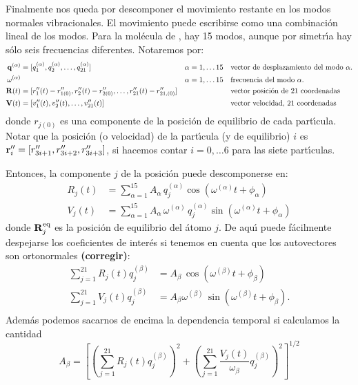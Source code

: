 Finalmente nos queda por descomponer el movimiento restante en los modos normales vibracionales. El movimiento puede escribirse como una combinaci\'{o}n lineal de los modos. Para la mol\'{e}cula de , hay 15 modos, aunque por simetr\'{\i}a hay s\'{o}lo seis frecuencias diferentes. Notaremos por:
\begin{align*}
  \mathbf{q}^{(\alpha)} &= [q^{(\alpha)}_{1},q^{(\alpha)}_{2}, \dots, q^{(\alpha)}_{21}] &  \alpha = 1,\dots 15 & \quad \text{vector de desplazamiento del modo $\alpha$.}\\
\omega^{(\alpha)} & & \alpha = 1,\dots 15  & \quad \text{frecuencia del modo $\alpha$.}\\
\mathbf{R}(t) &= [r''_{1}(t) - r''_{1(0)}, r''_{2}(t) - r''_{2 (0)}, \dots, r''_{21}(t) - r''_{21,(0)}] &  & \quad \text{vector posici\'{o}n de 21 coordenadas}\\
\mathbf{V}(t) &= [v''_{1}(t), v''_{2}(t), \dots, v''_{21}(t)] &  & \quad \text{vector velocidad, 21 coordenadas}
\end{align*}
donde $r_{j (0)}$ es una componente de la posici\'{o}n de equilibrio de cada part\'{\i}cula.  Notar que la posici\'{o}n (o velocidad) de la part\'{\i}cula (y de equilibrio) $i$ es $\mathbf{r}''_{i}= [r''_{3i+1}, r''_{3i+2}, r''_{3i+3}]$, si hacemos contar $i=0,\dots 6$ para las siete part\'{\i}culas.

Entonces, la componente $j$ de la posici\'{o}n puede descomponerse en:
\begin{align*}
  R_{j}(t) &= \sum_{\alpha=1}^{15} A_{\alpha}\, q^{(\alpha)}_{j} \cos{(\omega^{(\alpha)} t + \phi_{\alpha})} \\
  V_{j}(t)&= \sum_{\alpha=1}^{15} A_{\alpha}\, \omega^{(\alpha)} \, q^{(\alpha)}_{j} \sin{(\omega^{(\alpha)} t + \phi_{\alpha})}
\end{align*}
donde $\mathbf{R}^{\text{eq}}_{j}$ es la posici\'{o}n de equilibrio del \'{a}tomo $j$. De aqu\'{\i} puede f\'{a}cilmente despejarse los coeficientes de inter\'{e}s si tenemos en cuenta que los autovectores son ortonormales \textbf{(corregir)}:
\begin{align*}
  \sum_{j=1}^{21} R_{j}(t) q^{(\beta)}_{j} &= A_{\beta} \, \cos{(\omega^{(\beta)}t + \phi_{\beta})} \\ 
 \sum_{j=1}^{21} V_{j}(t) q^{(\beta)}_{j} &= A_{\beta} \omega^{(\beta)} \, \sin{(\omega^{(\beta)}t + \phi_{\beta})} .\\
\end{align*}
%
Adem\'{a}s podemos sacarnos de encima la dependencia temporal si calculamos la cantidad
\begin{equation*}
  A_{\beta} =\left[\left( \sum_{j=1}^{21} R_{j}(t) q^{(\beta)}_{j} \right)^{2} + \left( \sum_{j=1}^{21} \frac{V_{j}(t)}{\omega_{\beta}} q^{(\beta)}_{j} \right)^{2}\right]^{1/2}
\end{equation*}

